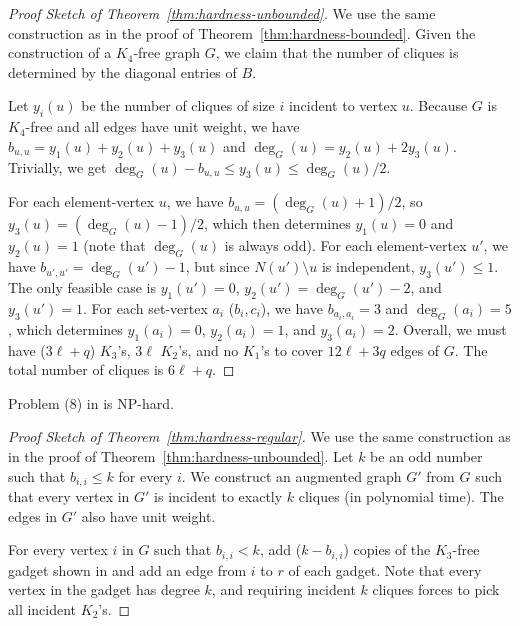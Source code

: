 \begin{proof}[Proof Sketch of Theorem~\ref{thm:hardness-unbounded}]
  We use the same construction as in the proof of Theorem~\ref{thm:hardness-bounded}.
  Given the construction of a $K_4$-free graph $G$, we claim that the number of cliques is
  determined by the diagonal entries of $B$.

  Let $y_i(u)$ be the number of cliques of size $i$ incident to vertex $u$.
  Because $G$ is $K_4$-free and all edges have unit weight, we have $b_{u,u} = y_1(u) + y_2(u) + y_3(u)$ and 
  $\deg_G(u) = y_2(u) + 2 y_3(u)$. Trivially, we get $\deg_G(u)-b_{u,u} \leq y_3(u) \leq \deg_G(u) /2$.

  For each element-vertex $u$, we have $b_{u,u}=(\deg_G(u)+1)/2$, so $y_3(u)=(\deg_G(u)-1)/2$,
  which then determines $y_1(u)=0$ and $y_2(u)=1$ (note that $\deg_G(u)$ is always odd).
  For each element-vertex $u'$, we have $b_{u',u'}=\deg_G(u')-1$,
  but since $N(u') \setminus u$ is independent, $y_3(u') \leq 1$.
  The only feasible case is $y_1(u')=0$, $y_2(u')=\deg_G(u')-2$, and $y_3(u')=1$.
  For each set-vertex $a_i$ ($b_i,c_i$), we have $b_{a_i,a_i}=3$ and $\deg_G(a_i)=5$,
  which determines $y_1(a_i)=0$, $y_2(a_i)=1$, and $y_3(a_i)=2$.
  Overall, we must have ($3\ell + q$) $K_3$'s, $3\ell$ $K_2$'s, and no $K_1$'s to cover $12\ell + 3q$ edges of $G$.
  The total number of cliques is $6\ell + q$.
\end{proof}

\begin{thm}\label{thm:hardness-regular}
  Problem (8) in  is NP-hard.
\end{thm}

\begin{proof}[Proof Sketch of Theorem~\ref{thm:hardness-regular}]
  We use the same construction as in the proof of Theorem~\ref{thm:hardness-unbounded}.
  Let $k$ be an odd number such that $b_{i,i} \leq k$ for every $i$.
  We construct an augmented graph $G'$ from $G$ such that every vertex in $G'$ is incident
  to exactly $k$ cliques (in polynomial time). The edges in $G'$ also have unit weight.

  For every vertex $i$ in $G$ such that $b_{i,i} < k$, add ($k-b_{i,i}$) copies of
  the $K_3$-free gadget shown in  and add an edge from $i$ to $r$ of each gadget.
  Note that every vertex in the gadget has degree $k$,
  and requiring incident $k$ cliques forces to pick all incident $K_2$'s.
\end{proof}

